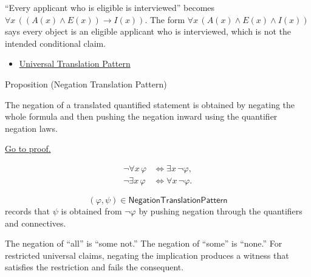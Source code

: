\begin{remark*}[Exposition]
``Every applicant who is eligible is interviewed'' becomes
\(\forall x\,((A(x)\land E(x))\to I(x))\). The form
\(\forall x\,(A(x)\land E(x)\land I(x))\) says every object is an eligible
applicant who is interviewed, which is not the intended conditional claim.
\end{remark*}

\begin{dependencies}
\begin{itemize}
  \item \hyperref[prop:universal-translation-pattern]{Universal Translation Pattern}
\end{itemize}
\end{dependencies}

\begin{propositionbox}{Proposition (Negation Translation Pattern)}
\begin{proposition}
\label{prop:negation-translation-pattern}
The negation of a translated quantified statement is obtained by negating the
whole formula and then pushing the negation inward using the quantifier
negation laws.

\noindent\hyperref[prf:negation-translation-pattern]{Go to proof.}
\end{proposition}
\end{propositionbox}

\begin{remark*}
\[
\begin{aligned}
\neg\forall x\,\varphi &\Longleftrightarrow \exists x\,\neg\varphi,\\
\neg\exists x\,\varphi &\Longleftrightarrow \forall x\,\neg\varphi.
\end{aligned}
\]
\end{remark*}

\begin{remark*}
\[
  (\varphi,\psi)\in\mathsf{NegationTranslationPattern}
\] records that
\(\psi\) is obtained from \(\neg\varphi\) by pushing negation through the
quantifiers and connectives.
\end{remark*}

\begin{remark*}[Interpretation]
The negation of ``all'' is ``some not.'' The negation of ``some'' is ``none.''
For restricted universal claims, negating the implication produces a witness
that satisfies the restriction and fails the consequent.
\end{remark*}

